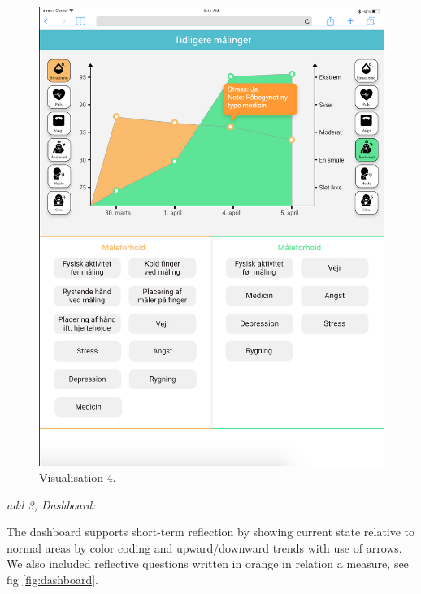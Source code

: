 \begin{figure}[h]
\begin{minipage}[b]{0.45\textwidth}
    \includegraphics[width=\textwidth]{images/study2/v4.png}
    \caption{Visualisation 4.}
    \label{fig:v4}
  \end{minipage}
\end{figure}

\FloatBarrier

\textit{add 3, Dashboard:}

The dashboard supports short-term reflection by showing current state relative to normal areas by color coding and upward/downward trends with use of arrows. We also included reflective questions written in orange in relation a measure, see fig \ref{fig:dashboard}.

